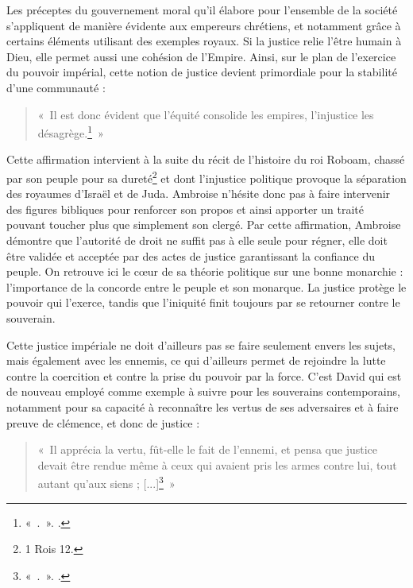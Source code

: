 \bigskip

Les préceptes du gouvernement moral qu'il élabore pour l'ensemble de la société s'appliquent de manière évidente aux empereurs chrétiens, et notamment grâce à certains éléments utilisant des exemples royaux. Si la justice relie l'être humain à Dieu, elle permet aussi une cohésion de l'Empire. Ainsi, sur le plan de l'exercice du pouvoir impérial, cette notion de justice devient primordiale pour la stabilité d'une communauté :

\bigskip

\begin{quote}
«~Il est donc évident que l’équité consolide les empires, l’injustice les désagrège.\footnote{«~.~». \cite[\nopp II, 95]{ambroise_devoirs_2}.}~»
\end{quote}

\bigskip

Cette affirmation intervient à la suite du récit de l'histoire du roi Roboam, chassé par son peuple pour sa dureté\footnote{1 Rois 12.} et dont l'injustice politique provoque la séparation des royaumes d'Israël et de Juda. Ambroise n'hésite donc pas à faire intervenir des figures bibliques pour renforcer son propos et ainsi apporter un traité pouvant toucher plus que simplement son clergé. Par cette affirmation, Ambroise démontre que l'autorité de droit ne suffit pas à elle seule pour régner, elle doit être validée et acceptée par des actes de justice garantissant la confiance du peuple. On retrouve ici le cœur de sa théorie politique sur une bonne monarchie : l'importance de la concorde entre le peuple et son monarque. La justice protège le pouvoir qui l'exerce, tandis que l'iniquité finit toujours par se retourner contre le souverain.

\bigskip

Cette justice impériale ne doit d'ailleurs pas se faire seulement envers les sujets, mais également avec les ennemis, ce qui d'ailleurs permet de rejoindre la lutte contre la coercition et contre la prise du pouvoir par la force. C'est David qui est de nouveau employé comme exemple à suivre pour les souverains contemporains, notamment pour sa capacité à reconnaître les vertus de ses adversaires et à faire preuve de clémence, et donc de justice :

\bigskip

\begin{quote}
«~Il apprécia la vertu, fût-elle le fait de l’ennemi, et pensa que justice devait être rendue même à ceux qui avaient pris les armes contre lui, tout autant qu’aux siens ; [...]\footnote{«~.~». \cite[\nopp II, 33]{ambroise_devoirs_2}.}~»
\end{quote}

